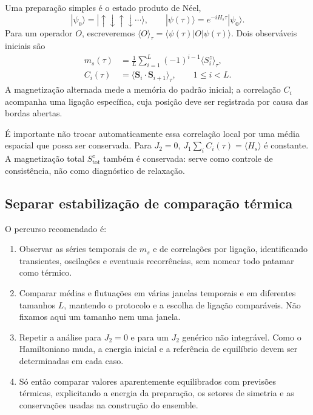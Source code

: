 \documentclass[a4paper,11pt]{article}
\begin{document}
Uma preparação simples é o estado produto de Néel,
\begin{equation}
  |\psi_0\rangle=|\uparrow\downarrow\uparrow\downarrow\cdots\rangle,
  \qquad
  |\psi(\tau)\rangle=e^{-iH_s\tau}|\psi_0\rangle.
\end{equation}
Para um operador $O$, escreveremos
$\langle O\rangle_\tau=\langle\psi(\tau)|O|\psi(\tau)\rangle$.
Dois observáveis iniciais são
\begin{align}
  m_s(\tau)&=\frac{1}{L}\sum_{i=1}^{L}
       (-1)^{i-1}\langle S_i^z\rangle_\tau,
       \label{eq:ms}\\
  C_i(\tau)&=\langle\mathbf S_i\cdot\mathbf S_{i+1}\rangle_\tau,
       \qquad 1\le i<L.
       \label{eq:corr}
\end{align}
A magnetização alternada mede a memória do padrão inicial; a correlação
$C_i$ acompanha uma ligação específica, cuja posição deve ser registrada
por causa das bordas abertas.

É importante não trocar automaticamente essa correlação local por uma
média espacial que possa ser conservada. Para $J_2=0$,
$J_1\sum_i C_i(\tau)=\langle H_s\rangle$ é constante.
A magnetização total $S_{\mathrm{tot}}^z$ também é conservada: serve
como controle de consistência, não como diagnóstico de relaxação.

\subsection{Separar estabilização de comparação térmica}

O percurso recomendado é:
\begin{enumerate}
  \item Observar as séries temporais de $m_s$ e de correlações por
  ligação, identificando transientes, oscilações e eventuais recorrências,
  sem nomear todo patamar como térmico.
  \item Comparar médias e flutuações em várias janelas temporais e em
  diferentes tamanhos $L$, mantendo o protocolo e a escolha de ligação
  comparáveis. Não fixamos aqui um tamanho nem uma janela.
  \item Repetir a análise para $J_2=0$ e para um $J_2$ genérico não
  integrável. Como o Hamiltoniano muda, a energia inicial e a referência
  de equilíbrio devem ser determinadas em cada caso.
  \item Só então comparar valores aparentemente equilibrados com
  previsões térmicas, explicitando a energia da preparação, os setores
  de simetria e as conservações usadas na construção do ensemble.
\end{enumerate}
\end{document}

